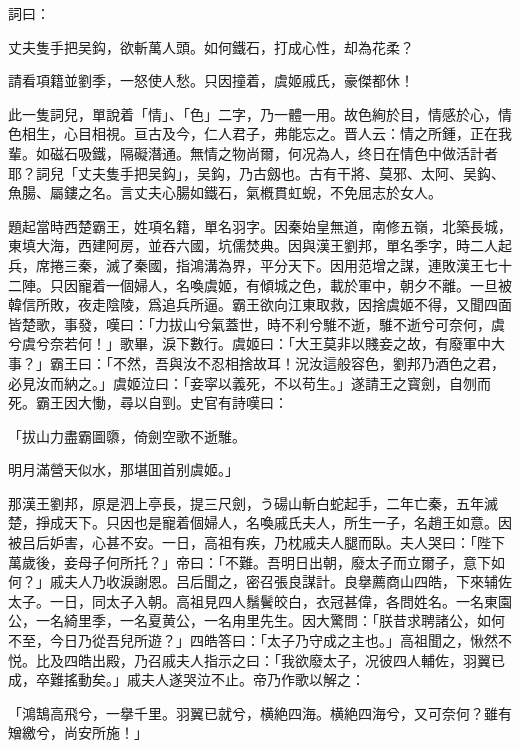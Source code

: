 詞曰：

\begin{myquote}
丈夫隻手把吴鈎，欲斬萬人頭。如何鐵石，打成心性，却為花柔？

請看項籍並劉季，一怒使人愁。只因撞着，虞姬戚氏，豪傑都休！
\end{myquote}

此一隻詞兒，單說着「情」、「色」二字，乃一體一用。故色絢於目，情感於心，情色相生，心目相視。亘古及今，仁人君子，弗能忘之。晋人云：情之所鍾，正在我輩。如磁石吸鐵，隔礙潛通。無情之物尚爾，何况為人，终日在情色中做活計者耶？詞兒「丈夫隻手把吴鈎」，吴鈎，乃古劔也。古有干將、莫邪、太阿、吴鈎、魚腸、屬鏤之名。言丈夫心腸如鐵石，氣槪貫虹蜺，不免屈志於女人。

題起當時西楚霸王，姓項名籍，單名羽字。因秦始皇無道，南修五嶺，北築長城，東填大海，西建阿房，並吞六國，坑儒焚典。因與漢王劉邦，單名季字，時二人起兵，席捲三秦，滅了秦國，指鴻溝為界，平分天下。因用范增之謀，連敗漢王七十二陣。只因寵着一個婦人，名喚虞姬，有傾城之色，載於軍中，朝夕不離。一旦被韓信所敗，夜走陰陵，爲追兵所逼。霸王欲向江東取救，因捨虞姬不得，又聞四面皆楚歌，事發，嘆曰：「力拔山兮氣蓋世，時不利兮騅不逝，騅不逝兮可奈何，虞兮虞兮奈若何！」歌畢，淚下數行。虞姬曰：「大王莫非以賤妾之故，有廢軍中大事？」霸王曰：「不然，吾與汝不忍相捨故耳！況汝這般容色，劉邦乃酒色之君，必見汝而納之。」虞姬泣曰：「妾寜以義死，不以苟生。」遂請王之寳劍，自刎而死。霸王因大慟，尋以自剄。史官有詩嘆曰：

\begin{myquote}
「拔山力盡霸圖隳，倚劍空歌不逝騅。

明月滿營天似水，那堪囬首别虞姬。」
\end{myquote}

那漢王劉邦，原是泗上亭長，提三尺劍，う碭山斬白蛇起手，二年亡秦，五年滅楚，掙成天下。只因也是寵着個婦人，名喚戚氏夫人，所生一子，名趙王如意。因被吕后妒害，心甚不安。一日，高祖有疾，乃枕戚夫人腿而臥。夫人哭曰：「陛下萬歲後，妾母子何所托？」帝曰：「不難。吾明日出朝，廢太子而立爾子，意下如何？」戚夫人乃收淚謝恩。吕后聞之，密召張良謀計。良擧薦商山四皓，下來辅佐太子。一日，同太子入朝。高祖見四人鬚鬢皎白，衣冠甚偉，各問姓名。一名東園公，一名綺里季，一名夏黄公，一名甪里先生。因大驚問：「朕昔求聘諸公，如何不至，今日乃從吾兒所遊？」四皓答曰：「太子乃守成之主也。」高祖聞之，愀然不悦。比及四皓出殿，乃召戚夫人指示之曰：「我欲廢太子，况彼四人輔佐，羽翼已成，卒難搖動矣。」戚夫人遂哭泣不止。帝乃作歌以解之：

\begin{myquote}
「鴻鵠高飛兮，一擧千里。羽翼已就兮，横絶四海。横絶四海兮，又可奈何？雖有矰繳兮，尚安所施！」
\end{myquote}

